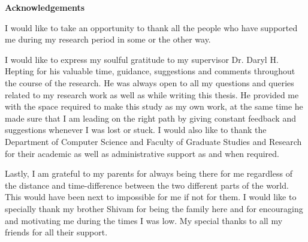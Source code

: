 
\begin{doublespace}
\begin{center}
\textbf{Acknowledgements}
\end{center}

I would like to take an opportunity to thank all the people who have supported me during my research period in some or the other way.

I would like to express my soulful gratitude to my supervisor Dr. Daryl H. Hepting for his valuable time, guidance, suggestions and comments throughout the course of the research. He was always open to all my questions and queries related to my research work as well as while writing 
this
thesis. 
He provided me with the space required to make this study as my own work, at the same time he made sure that I am leading on the right path by giving constant feedback and suggestions whenever I was lost or stuck. I would also like to thank the Department of Computer Science and Faculty of Graduate Studies and Research for their academic as well as administrative support as and when required.

Lastly, I am grateful to my parents for always being there for me regardless of the distance and time-difference between the two different parts of the world. This would have been next to impossible for me if not for them. I would like to specially thank my brother Shivam for being the family here and for encouraging and motivating me during the times I was low. My special thanks to all my friends for all their support.

\end{doublespace}
